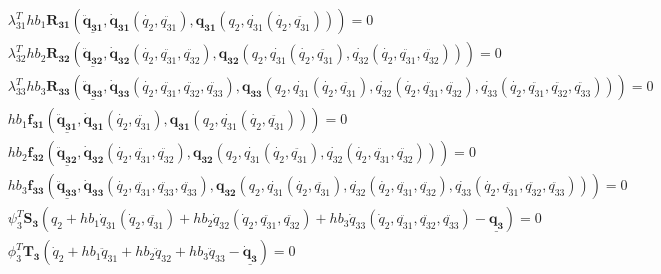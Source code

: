 \documentclass[10pt,letter]{book}
\begin{document}
     \begin{equation}\nonumber
       \begin{split}
         &\lambda_{31}^T h b_1 \mathbf{R_{31}}\left(\underline{\mathbf{\ddot{q}_{31}}},
         \mathbf{\dot{q}_{31}}(\dot{q_2},\ddot{q_{31}}),
         \mathbf{{q}_{31}}(q_2,\dot{q_{31}}(\dot{q_2},\ddot{q_{31}}))\right) = 0 \\
         &\lambda_{32}^T h b_2  \mathbf{R_{32}}\left(\underline{\mathbf{\ddot{q}_{32}}},
         \mathbf{\dot{q}_{32}}(\dot{q_2},\ddot{q_{31}},\ddot{q_{32}}),
         \mathbf{{q}_{32}}(q_2,\dot{q_{31}}(\dot{q_2},\ddot{q_{31}}),\dot{q_{32}}(\dot{q_2},\ddot{q_{31}},\ddot{q_{32}}))\right) = 0 \\
         &\lambda_{33}^T h b_3 \mathbf{R_{33}} \left(\underline{\mathbf{\ddot{q}_{33}}},
         \mathbf{\dot{q}_{33}}(\dot{q_2},\ddot{q_{31}},\ddot{q_{32}},\ddot{q_{33}}),
         \mathbf{{q}_{33}}(q_2,\dot{q_{31}}(\dot{q_2},\ddot{q_{31}}),\dot{q_{32}}(\dot{q_2},\ddot{q_{31}},\ddot{q_{32}}),\dot{q_{33}}(\dot{q_2},\ddot{q_{31}},\ddot{q_{32}},\ddot{q_{33}}))\right) = 0\\
         &h b_1 \mathbf{f_{31}}\left(\underline{\mathbf{\ddot{q}_{31}}},
         \mathbf{\dot{q}_{31}}(\dot{q_2},\ddot{q_{31}}),
         \mathbf{{q}_{31}}(q_2,\dot{q_{31}}(\dot{q_2},\ddot{q_{31}}))\right) = 0 \\
         &h b_2 \mathbf{f_{32}}\left(\underline{\mathbf{\ddot{q}_{32}}},
         \mathbf{\dot{q}_{32}}(\dot{q_2},\ddot{q_{31}},\ddot{q_{32}}),
         \mathbf{{q}_{32}}(q_2,\dot{q_{31}}(\dot{q_2},\ddot{q_{31}}),\dot{q_{32}}(\dot{q_2},\ddot{q_{31}},\ddot{q_{32}}))\right) = 0\\
         &h b_3 \mathbf{f_{33}}\left(\underline{\mathbf{\ddot{q}_{33}}},
         \mathbf{\dot{q}_{33}}(\dot{q_2},\ddot{q_{31}},\ddot{q_{33}},\ddot{q_{33}}),
         \mathbf{{q}_{32}}(q_2,\dot{q_{31}}(\dot{q_2},\ddot{q_{31}}),\dot{q_{32}}(\dot{q_2},\ddot{q_{31}},\ddot{q_{32}}),\dot{q_{33}}(\dot{q_2},\ddot{q_{31}},\ddot{q_{32}},\ddot{q_{33}}))\right) = 0\\
         &\psi_3^T \mathbf{S_3}(q_2 + h b_1 \dot{q}_{31}(\dot{q}_2,\ddot{q_{31}}) +  h b_2 \dot{q}_{32}(\dot{q}_2,\ddot{q_{31}},\ddot{q_{32}}) +  h b_3 \dot{q}_{33}(\dot{q}_2,\ddot{q_{31}},\ddot{q_{32}},\ddot{q_{33}}) - \underline{\mathbf{q_3}} ) = 0\\
         &\phi_3^T \mathbf{T_3}(\dot{q}_2 + h b_1 \ddot{q}_{31} +  h b_2 \ddot{q}_{32}  +  h b_3 \ddot{q}_{33} - \underline{\mathbf{\dot{q}_3}} ) = 0\\
       \end{split}
     \end{equation}
\end{document}
